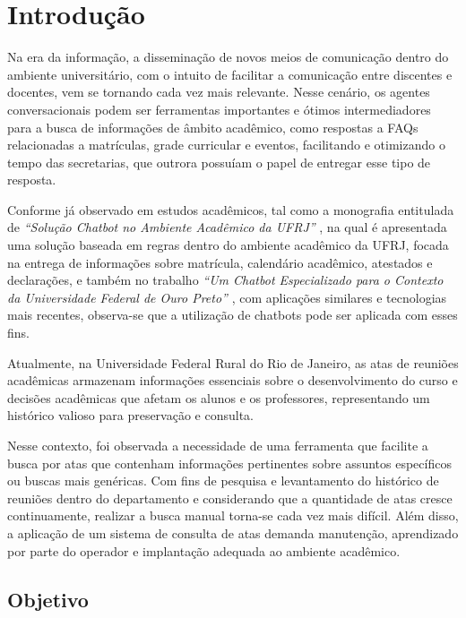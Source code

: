 \chapter{Introdução}\label{chp:INTRODUCAO}

Na era da informação, a disseminação de novos meios de comunicação dentro do ambiente universitário, com o intuito de facilitar a comunicação entre discentes e docentes, vem se tornando cada vez mais relevante. Nesse cenário, os agentes conversacionais podem ser ferramentas importantes e ótimos intermediadores para a busca de informações de âmbito acadêmico, como respostas a FAQs relacionadas a matrículas, grade curricular e eventos, facilitando e otimizando o tempo das secretarias, que outrora possuíam o papel de entregar esse tipo de resposta.

Conforme já observado em estudos acadêmicos, tal como a monografia entitulada de \textit{``Solução Chatbot no Ambiente Acadêmico da UFRJ''} \cite{ufrj}, na qual é apresentada uma solução baseada em regras dentro do ambiente acadêmico da UFRJ, focada na entrega de informações sobre matrícula, calendário acadêmico, atestados e declarações, e também no trabalho \textit{``Um Chatbot Especializado para o Contexto da Universidade Federal de Ouro Preto''} \cite{ufop}, com aplicações similares e tecnologias mais recentes, observa-se que a utilização de chatbots pode ser aplicada com esses fins.

Atualmente, na Universidade Federal Rural do Rio de Janeiro, as atas de reuniões acadêmicas armazenam informações essenciais sobre o desenvolvimento do curso e decisões acadêmicas que afetam os alunos e os professores, representando um histórico valioso para preservação e consulta.

Nesse contexto, foi observada a necessidade de uma ferramenta que facilite a busca por atas que contenham informações pertinentes sobre assuntos específicos ou buscas mais genéricas. Com fins de pesquisa e levantamento do histórico de reuniões dentro do departamento e considerando que a quantidade de atas cresce continuamente, realizar a busca manual torna-se cada vez mais difícil. Além disso, a aplicação de um sistema de consulta de atas demanda manutenção, aprendizado por parte do operador e implantação adequada ao ambiente acadêmico.

\section{Objetivo}


